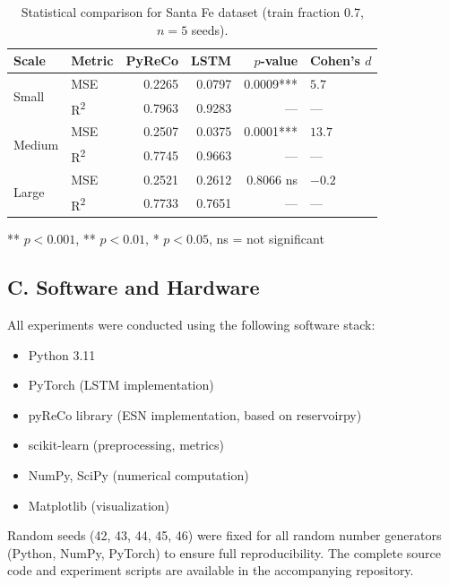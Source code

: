 \begin{table}[H]
\centering
\caption{Statistical comparison for Santa Fe dataset (train fraction 0.7, $n=5$ seeds).}
\label{tab:stat_sf}
\small
\begin{tabular}{@{}llrrrl@{}}
\toprule
Scale & Metric & PyReCo & LSTM & $p$-value & Cohen's $d$ \\
\midrule
\multirow{2}{*}{Small}
    & MSE  & 0.2265 & 0.0797 & 0.0009*** & $5.7$ \\
    & R\textsuperscript{2} & 0.7963 & 0.9283 & --- & --- \\
\midrule
\multirow{2}{*}{Medium}
    & MSE  & 0.2507 & 0.0375 & 0.0001*** & $13.7$ \\
    & R\textsuperscript{2} & 0.7745 & 0.9663 & --- & --- \\
\midrule
\multirow{2}{*}{Large}
    & MSE  & 0.2521 & 0.2612 & 0.8066 ns & $-0.2$ \\
    & R\textsuperscript{2} & 0.7733 & 0.7651 & --- & --- \\
\bottomrule
\end{tabular}

\vspace{0.3em}
\footnotesize *** $p<0.001$, ** $p<0.01$, * $p<0.05$, ns = not significant
\end{table}

\subsection*{C. Software and Hardware}

All experiments were conducted using the following software stack:
\begin{itemize}
    \item Python 3.11
    \item PyTorch (LSTM implementation)
    \item pyReCo library (ESN implementation, based on reservoirpy)
    \item scikit-learn (preprocessing, metrics)
    \item NumPy, SciPy (numerical computation)
    \item Matplotlib (visualization)
\end{itemize}

Random seeds (42, 43, 44, 45, 46) were fixed for all random number generators (Python, NumPy, PyTorch) to ensure full reproducibility. The complete source code and experiment scripts are available in the accompanying repository.
